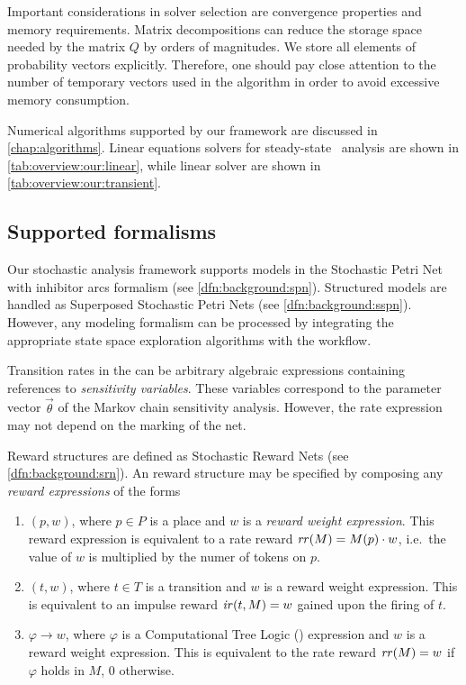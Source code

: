 \begin{itemize}
  Important considerations in solver selection are convergence
  properties and memory requirements. Matrix decompositions
  can reduce the storage space needed by the matrix $Q$ by orders of
  magnitudes. We store all elements of probability vectors
  explicitly. Therefore, one should pay close attention to the number
  of temporary vectors used in the algorithm in order to avoid
  excessive memory consumption.

  Numerical algorithms supported by our framework are discussed in
  \cref{chap:algorithms}. Linear equations solvers for steady-state
  \CTMC\ analysis are shown in \cref{tab:overview:our:linear}, while
  linear solver are shown in \cref{tab:overview:our:transient}.
\end{itemize}

\subsection{Supported formalisms}

Our stochastic analysis framework supports models in the Stochastic
Petri Net with inhibitor arcs formalism (see
\vref{dfn:background:spn}). Structured models are handled as
Superposed Stochastic Petri Nets (see
\vref{dfn:background:sspn}). However, any modeling formalism can be
processed by integrating the appropriate state space exploration
algorithms with the workflow.

Transition rates in the  can be arbitrary algebraic
expressions containing references to \emph{sensitivity
  variables}. These variables correspond to the parameter vector
$\vec{\theta}$ of the Markov chain sensitivity analysis. However, the rate
expression may not depend on the marking of the net.

Reward structures are defined as Stochastic Reward Nets (see
\vref{dfn:background:srn}). An  reward structure may be
specified by composing any \emph{reward expressions} of the forms
\begin{enumerate}
\item $(p, w)$, where $p \in P$ is a place and $w$ is a \emph{reward
    weight expression}. This reward expression is equivalent to
  a rate reward $\mathit{rr}(M) = M(p) \cdot w$, i.e.~the value of $w$
  is multiplied by the numer of tokens on $p$.
\item $(t, w)$, where $t \in T$ is a transition and $w$ is a reward
  weight expression. This is equivalent to an impulse reward
  $\mathit{ir}(t, M) = w$ gained upon the firing of $t$.
\item $\varphi \rightarrow w$, where $\varphi$ is a Computational Tree
  Logic () expression and $w$ is a reward weight
  expression. This is equivalent to the rate reward $\mathit{rr}(M) =
  w$ if $\varphi$ holds in $M$, $0$ otherwise.
\end{enumerate}

